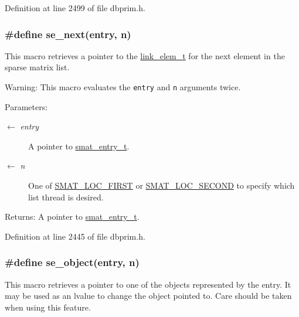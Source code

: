 Definition at line 2499 of file dbprim.h.\hypertarget{group__dbprim__smat_ga61}{
\subsubsection[se\_\-next]{\setlength{\rightskip}{0pt plus 5cm}\#define se\_\-next(entry, n)}}
\label{group__dbprim__smat_ga61}


This macro retrieves a pointer to the \hyperlink{group__dbprim__link_ga1}{link\_\-elem\_\-t} for the next element in the sparse matrix list.

\begin{Desc}
\item[Warning:]This macro evaluates the {\tt entry} and {\tt n} arguments twice.\end{Desc}
\begin{Desc}
\item[Parameters:]
\begin{description}
\item[\mbox{$\leftarrow$} {\em entry}]A pointer to \hyperlink{group__dbprim__smat_ga2}{smat\_\-entry\_\-t}. \item[\mbox{$\leftarrow$} {\em n}]One of \hyperlink{group__dbprim__smat_gga70a137}{SMAT\_\-LOC\_\-FIRST} or \hyperlink{group__dbprim__smat_gga70a138}{SMAT\_\-LOC\_\-SECOND} to specify which list thread is desired.\end{description}
\end{Desc}
\begin{Desc}
\item[Returns:]A pointer to \hyperlink{group__dbprim__smat_ga2}{smat\_\-entry\_\-t}.\end{Desc}


Definition at line 2445 of file dbprim.h.\hypertarget{group__dbprim__smat_ga65}{
\subsubsection[se\_\-object]{\setlength{\rightskip}{0pt plus 5cm}\#define se\_\-object(entry, n)}}
\label{group__dbprim__smat_ga65}


This macro retrieves a pointer to one of the objects represented by the entry. It may be used as an lvalue to change the object pointed to. Care should be taken when using this feature.

